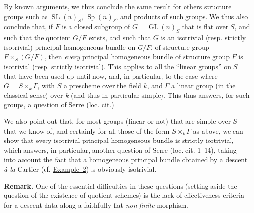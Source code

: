 \documentclass{article}
\newenvironment{rmenv}[1]
  {\phantomsection\par\medskip\noindent\textbf{#1.}\rmfamily}
  {\par\medskip}
\DeclareMathOperator{\GL}{GL}
\DeclareMathOperator{\SL}{SL}
\DeclareMathOperator{\Sp}{Sp}
\begin{document}
By known arguments, we thus conclude the same result for others structure groups such as $\SL(n)_S$, $\Sp(n)_S$, and products of such groups.
We thus also conclude that, if $F$ is a closed subgroup of $G=\GL(n)_S$ that is flat over $S$, and such that the quotient $G/F$ exists, and such that $G$ is an isotrivial (resp. strictly isotrivial) principal homogeneous bundle on $G/F$, of structure group $F\times_S(G/F)$, then \emph{every} principal homogeneous bundle of structure group $F$ is isotrivial (resp. strictly isotrivial).
This applies to all the ``linear groups'' on $S$ that have been used up until now, and, in particular, to the case where $G=S\times_k\Gamma$, with $S$ a prescheme over the field $k$, and $\Gamma$ a linear group (in the classical sense) over $k$ (and thus in particular simple).
This thus answers, for such groups, a question of Serre (loc. cit.).

We also point out that, for most groups (linear or not) that are simple over $S$ that we know of, and certainly for all those of the form $S\times_k\Gamma$ as above, we can show that every isotrivial principal homogeneous bundle is strictly isotrivial, which answers, in particular, another question of Serre (loc. cit. 1--14), taking into account the fact that a homogeneous principal bundle obtained by a descent \emph{\`{a} la} Cartier (cf. \hyperref[example:B.3(2)]{Example~2}) is obviously isotrivial.

\begin{rmenv}{Remark}
  One of the essential difficulties in these questions (setting aside the question of the existence of quotient schemes) is the lack of effectiveness criteria for a descent data along a faithfully flat \emph{non-finite} morphism.
\end{rmenv}




\end{document}
